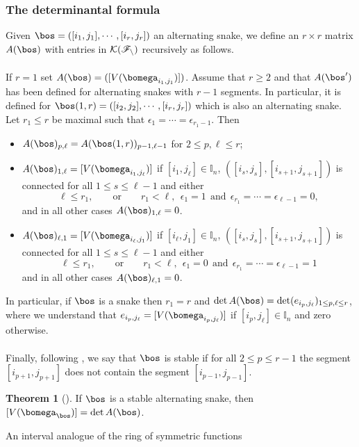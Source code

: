 \documentclass[11pt,reqno]{amsart}
\makeatletter
\theoremstyle{definition} \newtheorem*{defn}{Definition}
\theoremstyle{definition}
\newtheorem*{thm*}{Theorem}
\numberwithin{equation}{section}
\def\section{\def\@secnumfont{\mdseries}\@startsection{section}{1}%
  \z@{.7\linespacing\@plus\linespacing}{.5\linespacing}%
  {\normalfont\scshape\centering}}
\makeatother
\begin{document}
\subsubsection{The determinantal formula}
Given $\bos=([i_1,j_1], \cdots, [i_r,j_r])$  an alternating snake, we define an $r\times r$ matrix $A(\bos)$ with entries in $\cal K(\mathscr F_n)$ recursively as follows. \\\\
If $r=1$ set $A(\bos)=([V(\bomega_{i_1,j_1})])$. Assume that $r\ge2$ and that $A(\bos')$ has been defined for alternating
snakes with $r-1$ segments.  In particular, it is defined for $\bos(1,r)=([i_2,j_2],\cdots, [i_r,j_r])$ which is also an alternating snake. Let $r_1\le r$ be maximal such that $\epsilon_1=\cdots=\epsilon_{r_1-1}$. Then
\begin{itemize}
\item $A(\bos)_{p,\ell}=A(\bos(1,r))_{p-1,\ell-1}$ for $2\le p,\ell\le r$;
\item $A(\bos)_{1,\ell}=[V(\bomega_{i_1,j_\ell})]$ if $[i_1,j_\ell]\in\mathbb I_n$, $([i_s,j_s],[i_{s+1},j_{s+1}])$ is connected for all
$1\le s\le\ell-1$ and either
$$\ell\le r_1,\qquad\text{or}\qquad r_1<\ell,\ \ \epsilon_1=1\ \ \text{and}\ \ \epsilon_{r_1}=\cdots=\epsilon_{\ell-1}=0,$$ and in all other cases $A(\bos)_{1,\ell}=0$.
\item $A(\bos)_{\ell,1}=[V(\bomega_{i_\ell,j_1})]$ if  $[i_\ell,j_1]\in\mathbb I_n$, $([i_s,j_s],[i_{s+1},j_{s+1}])$ is connected for all
$1\le s\le\ell-1$ and either
$$\ell\le r_1,\qquad\text{or}\qquad r_1<\ell,\ \ \epsilon_1=0\ \ \text{and}\ \ \epsilon_{r_1}=\cdots=\epsilon_{\ell-1}=1$$ and in all other cases $A(\bos)_{\ell,1}=0$.
\end{itemize}
In particular, if $\bos$ is a snake then $r_1=r$ and $\det A(\bos)=\det(e_{i_p,j_\ell})_{1\le p,\ell\le r}$, where we understand that
$e_{i_p,j_\ell}= [V(\bomega_{i_p, j_\ell})]$ if $[i_p,j_\ell]\in\mathbb I_n$ and zero otherwise.\\\\ Finally, following \cite[Section 2.8.3]{BC25a}, we say that $\bos$ is stable if for all $2\le p\le r-1$ the segment
$[i_{p+1},j_{p+1}]$ does not contain the segment $[i_{p-1},j_{p-1}]$.
\begin{thm*}[{\cite[Theorem 3]{BC25a}}]\label{altdet} If $\bos$ is a stable alternating snake, then
$[V(\bomega_\bos)]=\det A(\bos)$.
\end{thm*}

\section{An interval analogue of the ring of symmetric functions}\label{lambdasec}
\end{document}
